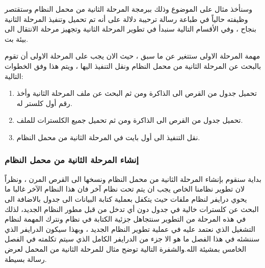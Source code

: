 \documentclass[document.tex]{subfiles}
\begin{document}
وسنأخذ مثال على الموضوع وذلك ببرمجة المرحلة الثانية من محمل النظام  وستقتصر وظيفته حالياً في طباعة رسالة ترحيبة دلالة على أنه تم تحميل وتنفيذ المرحلة الثانية بنجاح ، وفي الأقسام التالية سنبدأ في تطوير المرحلة الثانية وتجهيز مرحلة الانتقال الى بيئة  بت.

مهمة المرحلة الاولى ستتغير عن ما سبق ، حيث الان يجب على المرحلة الاولى أن تقوم بالبحث عن المرحلة الثانية من محمل النظام ونقل التنفيذ اليها ، ويتم هذا وفق الخطوات التالية:

\begin{enumerate}
\item تحميل جدول  من القرص الى الذاكرة ومن ثم البحث عن ملف المرحلة الثانية وأخذ رقم أول كلستر له.

\item تحميل جدول  من القرص الى الذاكرة ومن ثم تحميل جميع الكلسترات للملف.

\item نقل التنفيذ الى أول بايت في المرحلة الثانية من محمل النظام.
\end{enumerate}

\subsubsection{إنشاء المرحلة الثانية من محمل النظام}

بداية سنقوم بإنشاء المرحلة الثانية من محمل النظام ونسخها الى القرص المرن ، ونظراً لان تطوير نظامنا الخاص يجب ان يتم تحت نظام آخر فان هذا النظام الآخر غالبا ما يحوي درايفر لنظام ملفات  حيث يتكفل بعملية كتابة البيانات الى جدول  بالاضافة الى البحث عن كلسترات خالية في جدول  دون أي تدخل من قبل مطور النظام الجديد، لذلك في هذه المرحلة من التطوير سنتجاهل جزئية الكتابة في نظام  ونترك المهمة لنظام التشغيل الذي نعتمد عليه في عملية تطوير النظام الجديد ، وبهذا سيكون الدرايفر الذي سننشئه في هذا الفصل ما هو الا جزء من الدرايفر الكامل الذي سيتم تكلمته في الفصل الخامس بمشيئة الله.والشفرة التالية توضح مثال للمرحلة الثانية من المحمل لعرض رسالة بسيطة.

\begin{english}
\lstset{numberstyle=\tiny,numbersep=5pt,tabsize=2,extendedchars=true,breaklines=true,frame=b,showspaces=false, showtabs=false,xleftmargin=10pt,framexleftmargin=10pt,framexrightmargin=5pt,framexbottommargin=4pt,showstringspaces=false,language=[x86masm]Assembler}


\end{english}
\end{document}
